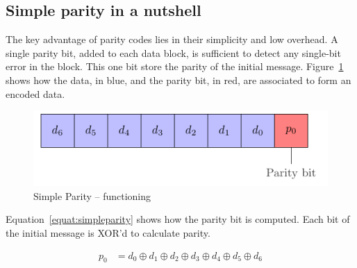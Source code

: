 \subsection{Simple parity in a nutshell}
The key advantage of parity codes lies in their simplicity and low overhead. A single parity bit, added to each data block, is sufficient to detect any single-bit error in the block. This one bit store the parity of the initial message. Figure~\ref{fig:simpleparity_functionning} shows how the data, in blue, and the parity bit, in red, are associated to form an encoded data.

\begin{figure}[ht]
    \centering
    \includegraphics[page=1]{c5_countermeasures_dift/img/simple_parity.pdf}
    \caption{Simple Parity -- functioning}
    \label{fig:simpleparity_functionning}
\end{figure}

Equation~\ref{equat:simpleparity} shows how the parity bit is computed. Each bit of the initial message is XOR'd to calculate parity.

\begin{equation} \label{equat:simpleparity}
    \begin{split}
        p_{0} &= d_{0} \oplus d_{1} \oplus d_{2} \oplus d_{3} \oplus d_{4} \oplus d_{5} \oplus d_{6}
    \end{split}
\end{equation}


